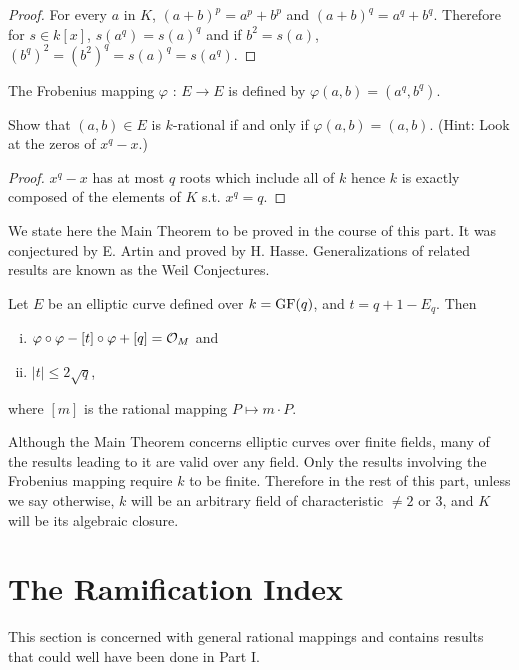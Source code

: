 \begin{proof}
For every $a$ in $K$, $(a+b)^p=a^p+b^p$ and $(a+b)^q=a^q+b^q$. Therefore for $s \in k[x]$, $s(a^q)=s(a)^q$ and if $b^2 = s(a)$, $(b^q)^2 =(b^2)^q = s(a)^q = s(a^q)$.
\end{proof}

\begin{defi}
\label{d10.2}
The Frobenius mapping $\varphi$ : $E\rightarrow E$ is defined by $\varphi(a,b)= (a^{q},b^{q})$.
\end{defi}

\begin{exo}
\label{e10.3}
Show that $(a, b)\in E$ is $k$-rational if and only if $\varphi(a, b)=(a, b)$. (Hint: Look at the zeros of $x^{q}-x.$)
\end{exo}

\begin{proof}
$x^{q}-x$ has at most $q$ roots which include all of $k$ hence $k$ is exactly composed of the elements of $K$ s.t. $x^q=q$.
\end{proof}

We state here the Main Theorem to be proved in the course of this part. It was conjectured by E. Artin and proved by H. Hasse. Generalizations of related results are known as the Weil Conjectures.

\begin{theo*}
Let $E$ be an elliptic curve defined over $k= \operatorname{GF}(q)$, and $t =q+1-E_{q}$. Then
\begin{enumerate}[(i)]
\item
$\varphi\circ\varphi-[t] \circ\varphi+[q]=\mathcal{O}_{M}$ and
\item
$|t| \leq 2\sqrt{q}$,
\end{enumerate}
where $[m]$ is the rational mapping $P\mapsto m\cdot P$.
\end{theo*}

Although the Main Theorem concerns elliptic curves over finite fields, many of the results leading to it are valid over any field. Only the results involving the Frobenius mapping require $k$ to be finite. Therefore in the rest of this part, unless we say otherwise, $k$ will be an arbitrary field of characteristic $\neq 2$ or $3$, and $K$ will be its algebraic closure.

\section{The Ramification Index}

This section is concerned with general rational mappings and contains results that could well have been done in Part I.

